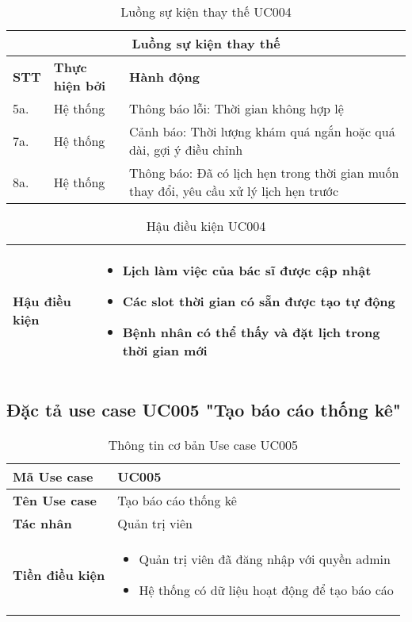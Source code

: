 \documentclass[../DoAn.tex]{subfiles}
\begin{document}
\begin{table}[H]
\centering
\begin{tabular}{|p{1cm}|p{3cm}|p{9cm}|}
\hline
\multicolumn{3}{|c|}{\textbf{Luồng sự kiện thay thế}} \\
\hline
\textbf{STT} & \textbf{Thực hiện bởi} & \textbf{Hành động} \\
\hline
5a. & Hệ thống & Thông báo lỗi: Thời gian không hợp lệ \\
\hline
7a. & Hệ thống & Cảnh báo: Thời lượng khám quá ngắn hoặc quá dài, gợi ý điều chỉnh \\
\hline
8a. & Hệ thống & Thông báo: Đã có lịch hẹn trong thời gian muốn thay đổi, yêu cầu xử lý lịch hẹn trước \\
\hline
\end{tabular}
\caption{Luồng sự kiện thay thế UC004}
\end{table}

\begin{table}[H]
\centering
\begin{tabular}{|p{3cm}|p{10cm}|}
\hline
\textbf{Hậu điều kiện} & 
\begin{itemize}
    \item Lịch làm việc của bác sĩ được cập nhật
    \item Các slot thời gian có sẵn được tạo tự động
    \item Bệnh nhân có thể thấy và đặt lịch trong thời gian mới
\end{itemize} \\
\hline
\end{tabular}
\caption{Hậu điều kiện UC004}
\end{table}

\subsection{Đặc tả use case UC005 "Tạo báo cáo thống kê"}
\label{subsection:2.3.5}

\begin{table}[H]
\centering
\begin{tabular}{|p{3cm}|p{10cm}|}
\hline
\textbf{Mã Use case} & UC005 \\
\hline
\textbf{Tên Use case} & Tạo báo cáo thống kê \\
\hline
\textbf{Tác nhân} & Quản trị viên \\
\hline
\textbf{Tiền điều kiện} & 
\begin{itemize}
    \item Quản trị viên đã đăng nhập với quyền admin
    \item Hệ thống có dữ liệu hoạt động để tạo báo cáo
\end{itemize} \\
\hline
\end{tabular}
\caption{Thông tin cơ bản Use case UC005}
\end{table}
\end{document}
